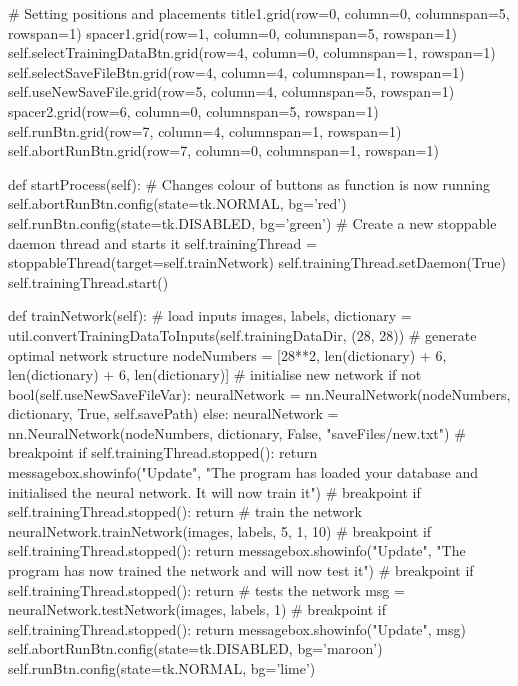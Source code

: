 \documentclass{report}
\begin{document}
\begin{python}
        # Setting positions and placements
        title1.grid(row=0, column=0, columnspan=5, rowspan=1)
        spacer1.grid(row=1, column=0, columnspan=5, rowspan=1)
        self.selectTrainingDataBtn.grid(row=4, column=0, columnspan=1, rowspan=1)
        self.selectSaveFileBtn.grid(row=4, column=4, columnspan=1, rowspan=1)
        self.useNewSaveFile.grid(row=5, column=4, columnspan=5, rowspan=1)
        spacer2.grid(row=6, column=0, columnspan=5, rowspan=1)
        self.runBtn.grid(row=7, column=4, columnspan=1, rowspan=1)
        self.abortRunBtn.grid(row=7, column=0, columnspan=1, rowspan=1)

    def startProcess(self):
        # Changes colour of buttons as function is now running
        self.abortRunBtn.config(state=tk.NORMAL, bg='red')
        self.runBtn.config(state=tk.DISABLED, bg='green')
        # Create a new stoppable daemon thread and starts it
        self.trainingThread = stoppableThread(target=self.trainNetwork)
        self.trainingThread.setDaemon(True)
        self.trainingThread.start()

    def trainNetwork(self):
        # load inputs
        images, labels, dictionary = util.convertTrainingDataToInputs(self.trainingDataDir, (28, 28))
        # generate optimal network structure
        nodeNumbers = [28**2, len(dictionary) + 6, len(dictionary) + 6, len(dictionary)]
        # initialise new network
        if not bool(self.useNewSaveFileVar):
            neuralNetwork = nn.NeuralNetwork(nodeNumbers, dictionary, True, self.savePath)
        else:
            neuralNetwork = nn.NeuralNetwork(nodeNumbers, dictionary, False, "saveFiles/new.txt")
        # breakpoint
        if self.trainingThread.stopped():
            return
        messagebox.showinfo("Update",
                            "The program has loaded your database and 
                            initialised the neural network. It will now train it")
        # breakpoint
        if self.trainingThread.stopped():
            return
        # train the network
        neuralNetwork.trainNetwork(images, labels, 5, 1, 10)
        # breakpoint
        if self.trainingThread.stopped():
            return
        messagebox.showinfo("Update",
                            "The program has now trained the network and will
                            now test it")
        # breakpoint
        if self.trainingThread.stopped():
            return
        # tests the network
        msg = neuralNetwork.testNetwork(images, labels, 1)
        # breakpoint
        if self.trainingThread.stopped():
            return
        messagebox.showinfo("Update", msg)
        self.abortRunBtn.config(state=tk.DISABLED, bg='maroon')
        self.runBtn.config(state=tk.NORMAL, bg='lime')


\end{python}
\end{document}
